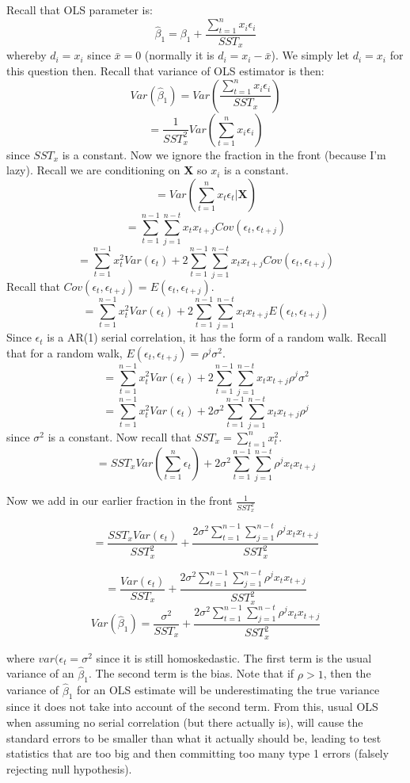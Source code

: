 \documentclass[11pt, oneside]{article}
\theoremstyle{definition}
\begin{document}
Recall that OLS parameter is:
$$
\hat{\beta}_1 = \beta_1 + \frac{\sum\limits_{t=1}^nx_i\epsilon_i}{SST_x}
$$
whereby $d_i = x_i$ since $\bar{x} = 0$ (normally it is $d_i = x_i - \bar{x}$). We simply let $d_i = x_i$ for this question then. Recall that variance of OLS estimator is then:
$$
Var(\hat{\beta}_1) = Var(\frac{\sum\limits_{t=1}^nx_i\epsilon_i}{SST_x})
$$
$$
= \frac{1}{SST_x^2}Var(\sum\limits_{t=1}^nx_i\epsilon_i)
$$
since $SST_x$ is a constant. Now we ignore the fraction in the front (because I'm lazy). Recall we are conditioning on \textbf{X} so $x_i$ is a constant.
$$
= Var(\sum\limits_{t=1}^{n}x_t\epsilon_t|\bm{X})
$$
$$
= \sum\limits_{t=1}^{n-1}\sum\limits_{j=1}^{n-t}x_tx_{t+j}Cov(\epsilon_t,\epsilon_{t+j})
$$
$$
= \sum\limits_{t=1}^{n-1}x_t^2Var(\epsilon_t) +  2\sum\limits_{t=1}^{n-1}\sum\limits_{j=1}^{n-t}x_tx_{t+j}Cov(\epsilon_t,\epsilon_{t+j})
$$
Recall that $Cov(\epsilon_t,\epsilon_{t+j}) = E(\epsilon_t,\epsilon_{t+j})$.
$$
= \sum\limits_{t=1}^{n-1}x_t^2Var(\epsilon_t) +  2\sum\limits_{t=1}^{n-1}\sum\limits_{j=1}^{n-t}x_tx_{t+j}E(\epsilon_t,\epsilon_{t+j})
$$
Since $\epsilon_t$ is a AR(1) serial correlation, it has the form of a random walk. Recall that for a random walk, $E(\epsilon_t,\epsilon_{t+j}) = \rho^j\sigma^2$.
$$
= \sum\limits_{t=1}^{n-1}x_t^2Var(\epsilon_t) +  2\sum\limits_{t=1}^{n-1}\sum\limits_{j=1}^{n-t}x_tx_{t+j}\rho^j\sigma^2
$$
$$
= \sum\limits_{t=1}^{n-1}x_t^2Var(\epsilon_t) +  2\sigma^2\sum\limits_{t=1}^{n-1}\sum\limits_{j=1}^{n-t}x_tx_{t+j}\rho^j
$$
since $\sigma^2$ is a constant. Now recall that $SST_x = \sum\limits_{t=1}^{n}x_t^2$.
$$
= SST_xVar(\sum\limits_{t=1}^{n}\epsilon_t) +  2\sigma^2\sum\limits_{t=1}^{n-1}\sum\limits_{j=1}^{n-t}\rho^jx_tx_{t+j}
$$

Now we add in our earlier fraction in the front $\frac{1}{SST_x^2}$

$$
= \frac{SST_xVar(\epsilon_t)}{SST_x^2} +  \frac{2\sigma^2\sum\limits_{t=1}^{n-1}\sum\limits_{j=1}^{n-t}\rho^jx_tx_{t+j}}{SST_x^2}
$$

$$
= \frac{Var(\epsilon_t)}{SST_x} +  \frac{2\sigma^2\sum\limits_{t=1}^{n-1}\sum\limits_{j=1}^{n-t}\rho^jx_tx_{t+j}}{SST_x^2}
$$
$$
Var(\hat{\beta}_1)= \frac{\sigma^2}{SST_x} +  \frac{2\sigma^2\sum\limits_{t=1}^{n-1}\sum\limits_{j=1}^{n-t}\rho^jx_tx_{t+j}}{SST_x^2}
$$

where $var(\epsilon_t = \sigma^2$ since it is still homoskedastic. The first term is the usual variance of an $\hat{\beta}_1$. The second term is the bias. Note that if $\rho>1$, then the variance of $\hat{\beta}_1$ for an OLS estimate will be underestimating the true variance since it does not take into account of the second term. From this, usual OLS when assuming no serial correlation (but there actually is), will cause the standard errors to be smaller than what it actually should be, leading to test statistics that are too big and then committing too many type 1 errors (falsely rejecting null hypothesis).
\end{document}
